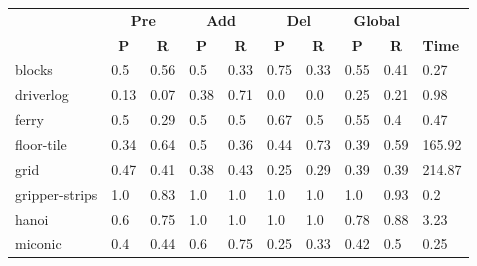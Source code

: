 \begin{table}[hbt!]
	\begin{center}		
		\begin{tabular}{l|l|l|l|l|l|l||l|l|l|}
			& \multicolumn{2}{|c|}{\bf Pre} & \multicolumn{2}{|c|}{\bf Add} & \multicolumn{2}{|c||}{\bf Del} & \multicolumn{2}{|c|}{\bf Global} & \\ \cline{2-9}			
			& \multicolumn{1}{|c|}{\bf P} & \multicolumn{1}{|c|}{\bf R} & \multicolumn{1}{|c|}{\bf P} & \multicolumn{1}{|c|}{\bf R} & \multicolumn{1}{|c|}{\bf P} & \multicolumn{1}{|c||}{\bf R} &  \multicolumn{1}{|c|}{\bf P} & \multicolumn{1}{|c|}{\bf R} & {\bf Time} \\
			\hline
			blocks & 0.5 & 0.56 & 0.5 & 0.33 & 0.75 & 0.33 & 0.55 & 0.41& 0.27 \\ %
			driverlog & 0.13 & 0.07 & 0.38 & 0.71 & 0.0 & 0.0 & 0.25 & 0.21& 0.98 \\ %
			ferry & 0.5 & 0.29 & 0.5 & 0.5 & 0.67 & 0.5 & 0.55 & 0.4& 0.47 \\ %
			floor-tile & 0.34 & 0.64 & 0.5 & 0.36 & 0.44 & 0.73 & 0.39 & 0.59& 165.92 \\ %
			grid & 0.47 & 0.41 & 0.38 & 0.43 & 0.25 & 0.29 & 0.39 & 0.39& 214.87 \\ %
			gripper-strips & 1.0 & 0.83 & 1.0 & 1.0 & 1.0 & 1.0 & 1.0 & 0.93& 0.2 \\ %
			hanoi & 0.6 & 0.75 & 1.0 & 1.0 & 1.0 & 1.0 & 0.78 & 0.88& 3.23 \\ %
			miconic & 0.4 & 0.44 & 0.6 & 0.75 & 0.25 & 0.33 & 0.42 & 0.5& 0.25 \\ %

\end{tabular}
\end{center}
\end{table}
